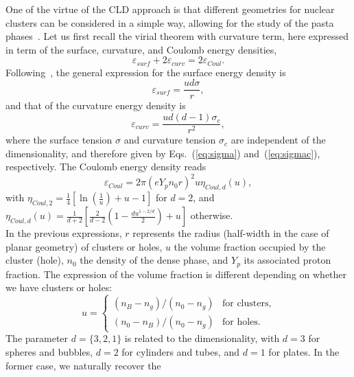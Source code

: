 One of the virtue of the CLD approach is that different geometries for nuclear
clusters can be considered in a simple way, allowing for the study of the pasta
phases~\cite{Ravenhall1983, Lattimer1991, Lorenz1993, Newton2012}. Let us first 
recall the virial theorem with curvature term, here expressed in term of the 
surface, curvature, and Coulomb energy densities,
%
\begin{equation}
  \varepsilon_{surf} + 2\varepsilon_{curv} =
  2\varepsilon_{Coul}.\label{eq:virdens}
\end{equation}
%
Following~\cite{Ravenhall1983,Newton2012}, the general expression for the 
surface energy density is
%
\begin{equation}
  \varepsilon_{surf} = \frac{ud\sigma}{r},
\end{equation}
%
and that of the curvature energy density is
%
\begin{equation}
  \varepsilon_{curv} = \frac{ud(d-1)\sigma_c}{{r}^2},
\end{equation}
%
where the surface tension $\sigma$ and curvature tension $\sigma_c$ are
independent of the dimensionality, and therefore given by 
Eqs.~(\ref{eq:sigma}) and~(\ref{eq:sigmac}), respectively. The Coulomb energy 
density reads
%
\begin{equation}
  \varepsilon_{Coul} = 2\pi(eY_pn_0r)^2u\eta_{Coul,d}(u),
\end{equation}
%
with $\eta_{Coul,2} = \frac{1}{4}\left[\ln\left(\frac{1}{u}\right) + u 
- 1\right]$ for $d=2$, and $\eta_{Coul,d}(u) =
\frac{1}{d+2}\left[\frac{2}{d-2}\left(1-\frac{du^{1-2/d}}{2}\right) +
u\right]$ otherwise.
\\In the previous expressions, $r$ represents the radius (half-width in the
case of planar geometry) of clusters or holes,
$u$ the volume fraction occupied by the cluster (hole), $n_0$ the density of 
the dense phase, and $Y_p$ its associated proton fraction. The expression of 
the volume fraction is different depending on whether we have clusters or 
holes:
%
\begin{equation}
  u =
    \begin{cases}
      (n_B-n_g)/(n_0-n_g) & \text{for clusters,}\\
      (n_0-n_B)/(n_0-n_g) & \text{for holes.}
    \end{cases}       
\end{equation}
%
The parameter $d=\{3,2,1\}$ is related to the dimensionality, 
with $d=3$ for spheres and bubbles, $d=2$ for cylinders and
tubes, and $d=1$ for plates. In the former case, we naturally recover the 
